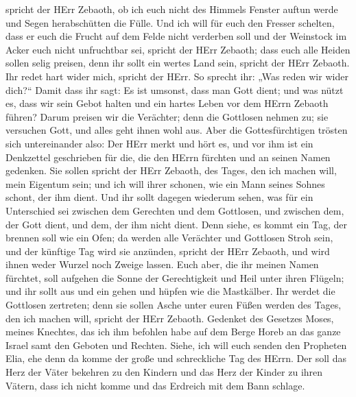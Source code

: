 spricht der HErr Zebaoth, ob ich euch nicht des Himmels Fenster auftun
werde und Segen herabschütten die Fülle.  Und ich will für
euch den Fresser schelten, dass er euch die Frucht auf dem Felde nicht
verderben soll und der Weinstock im Acker euch nicht unfruchtbar sei,
spricht der HErr Zebaoth;  dass euch alle Heiden sollen
selig preisen, denn ihr sollt ein wertes Land sein, spricht der HErr
Zebaoth.  Ihr redet hart wider mich, spricht der HErr. So
sprecht ihr: „Was reden wir wider dich?{}``  Damit dass ihr
sagt: Es ist umsonst, dass man Gott dient; und was nützt es, dass wir
sein Gebot halten und ein hartes Leben vor dem HErrn Zebaoth führen?
 Darum preisen wir die Verächter; denn die Gottlosen nehmen
zu; sie versuchen Gott, und alles geht ihnen wohl aus. 
Aber die Gottesfürchtigen trösten sich untereinander also: Der HErr
merkt und hört es, und vor ihm ist ein Denkzettel geschrieben für die,
die den HErrn fürchten und an seinen Namen gedenken.  Sie
sollen spricht der HErr Zebaoth, des Tages, den ich machen will, mein
Eigentum sein; und ich will ihrer schonen, wie ein Mann seines Sohnes
schont, der ihm dient.  Und ihr sollt dagegen wiederum
sehen, was für ein Unterschied sei zwischen dem Gerechten und dem
Gottlosen, und zwischen dem, der Gott dient, und dem, der ihm nicht
dient.  Denn siehe, es kommt ein Tag, der brennen soll wie
ein Ofen; da werden alle Verächter und Gottlosen Stroh sein, und der
künftige Tag wird sie anzünden, spricht der HErr Zebaoth, und wird ihnen
weder Wurzel noch Zweige lassen.  Euch aber, die ihr meinen
Namen fürchtet, soll aufgehen die Sonne der Gerechtigkeit und Heil unter
ihren Flügeln; und ihr sollt aus und ein gehen und hüpfen wie die
Mastkälber.  Ihr werdet die Gottlosen zertreten; denn sie
sollen Asche unter euren Füßen werden des Tages, den ich machen will,
spricht der HErr Zebaoth.  Gedenket des Gesetzes Moses,
meines Knechtes, das ich ihm befohlen habe auf dem Berge Horeb an das
ganze Israel samt den Geboten und Rechten.  Siehe, ich will
euch senden den Propheten Elia, ehe denn da komme der große und
schreckliche Tag des HErrn.  Der soll das Herz der Väter
bekehren zu den Kindern und das Herz der Kinder zu ihren Vätern, dass
ich nicht komme und das Erdreich mit dem Bann schlage.
